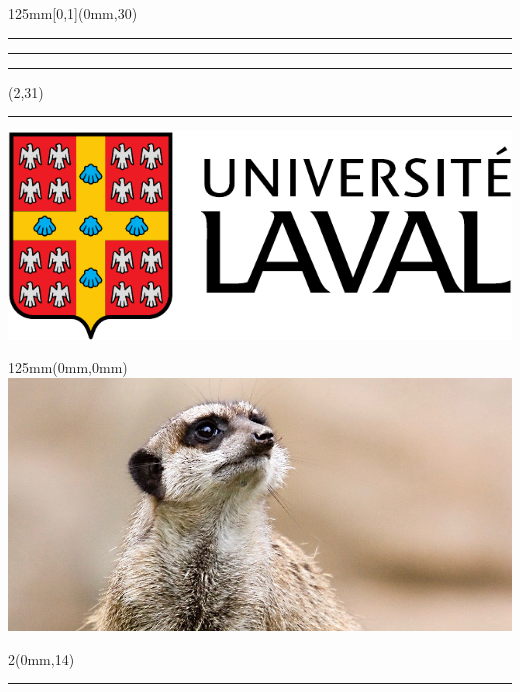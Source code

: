 \begin{frame}[plain]
  \begin{textblock*}{125mm}[0,1](0mm,30\TPVertModule)
    \textcolor{rouge}{\rule{\banderougewidth}{\banderougeheight}}%
    \rule{\gapwidth}{0pt}%
    \textcolor{or}{\rule{\bandeorwidth}{\bandeorheight}}           %
  \end{textblock*}

  \begin{textblock*}{\TPHorizModule}(2\TPHorizModule,31\TPVertModule)
    \rule{\gapwidth}{0pt}%
    \includegraphics[height=\logoheight,keepaspectratio=true]{ul_p}
  \end{textblock*}

  \begin{textblock*}{125mm}(0mm,0mm)
    \includegraphics[width=\imagewidth,%
                     keepaspectratio=true]{Suricata-diapos.jpg}
  \end{textblock*}

  \begin{textblock*}{2\TPHorizModule}(0mm,14\TPVertModule)
    \textcolor{white}{\rule{\linewidth}{10\TPVertModule}}
  \end{textblock*}


\end{frame}
